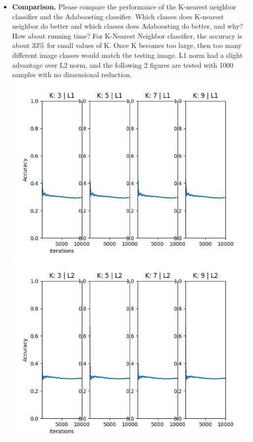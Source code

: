 \documentclass[11pt]{article}
\begin{document}
    \begin{itemize}
        \item \textbf{Comparison.} Please compare the performance of the K-nearest neighbor classifier and the
        Adaboosting classifier. Which classes does K-nearest neighbor do better and which classes does Adaboosting do
        better, and
        why? How about running time?\newline
        For K-Nearest Neighbor classifier, the accuracy is about 33\% for small values of K. Once K becomes too
        large, then too many different image classes would match the testing image. L1 norm had a slight advantage
        over L2 norm, and the following 2 figures are tested with 1000 samples with no dimensional reduction.\newline
        \includegraphics[width=\textwidth]{Output Pictures/Nearest Neighbors L1}
        \includegraphics[width=\textwidth]{Output Pictures/Nearest Neighbors L2}

\end{itemize}
\end{document}
